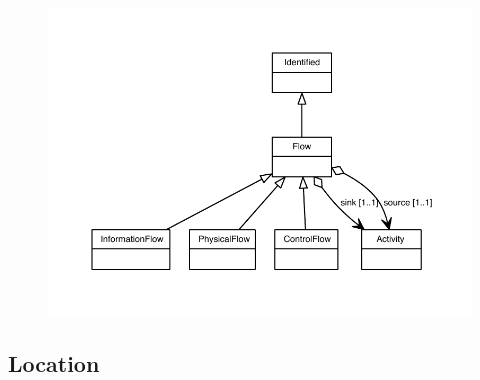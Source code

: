 \begin{figure}[ht]
\begin{center}
\includegraphics[scale=0.8]{uml/Flow_abstraction_hierarchy.pdf}
\end{center}
\end{figure}

\subsection{Location}
\label{sec:Location}

